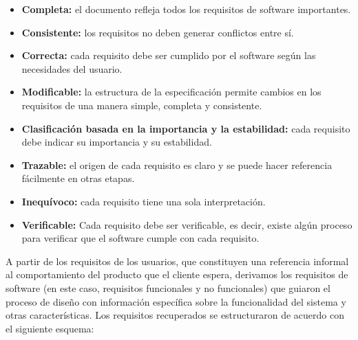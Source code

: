 \begin{itemize}

\item \textbf{Completa:} el documento refleja todos los requisitos de software importantes.

\item \textbf{Consistente:} los requisitos no deben generar conflictos entre sí.

\item \textbf{Correcta:} cada requisito debe ser cumplido por el software según las necesidades del usuario.


\item \textbf{Modificable:} la estructura de la especificación permite cambios en los requisitos de una manera simple, completa y consistente.

\item \textbf{Clasificación basada en la importancia y la estabilidad:} cada requisito debe indicar su importancia y su estabilidad.

\item \textbf{Trazable:} el origen de cada requisito es claro y se puede hacer referencia fácilmente en otras etapas.

\item \textbf{Inequívoco:} cada requisito tiene una sola interpretación.

\item \textbf{Verificable:} Cada requisito debe ser verificable, es decir, existe algún proceso para verificar que el software cumple con cada requisito.

\end{itemize}

A partir de los requisitos de los usuarios, que constituyen una referencia informal al comportamiento del producto que el cliente espera, derivamos los requisitos de software (en este caso, requisitos funcionales y no funcionales) que guiaron el proceso de diseño con información específica sobre la funcionalidad del sistema y otras características. Los requisitos recuperados se estructuraron de acuerdo con el siguiente esquema:


